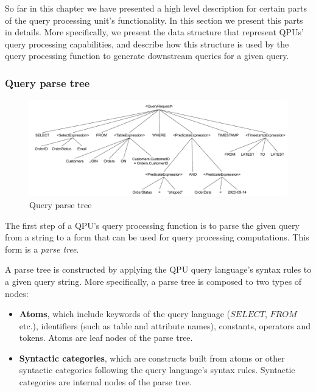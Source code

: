 So far in this chapter we have presented a high level description for certain parts of the query processing unit's
functionality.
In this section we present this parts in details.
More specifically, we present the data structure that represent QPUs' query processing capabilities,
and describe how this structure is used by the query processing function to generate downstream queries for a given query.

\subsubsection{Query parse tree}
\label{sec:query_parse_tree}

\begin{figure}[t]
  \centering
    \includegraphics[width=\textwidth]{./figures/design_pattern/parse_tree.pdf}
  \caption{Query parse tree}
  \label{fig:parse_tree}
\end{figure}

The first step of a QPU's query processing function is to parse the given query from a string to a form that can be used
for query processing computations.
This form is a \textit{parse tree}.

A parse tree is constructed by applying the QPU query language's syntax rules to a given query string.
More specifically, a parse tree is composed to two types of nodes:

\begin{itemize}
  \item \textbf{Atoms}, which include keywords of the query language ($SELECT$, $FROM$ etc.),
  identifiers (such as table and attribute names), constants, operators and tokens.
  Atoms are leaf nodes of the parse tree.

  \item \textbf{Syntactic categories}, which are constructs built from atoms or other syntactic categories
  following the query language's syntax rules.
  Syntactic categories are internal nodes of the parse tree.
\end{itemize}

